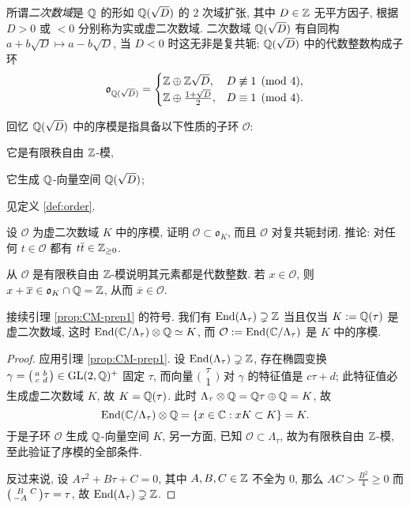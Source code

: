 所谓\emph{二次数域}是 $\mathbb{Q}$ 的形如 $\mathbb{Q}(\sqrt{D})$ 的 $2$ 次域扩张, 其中 $D \in \mathbb{Z}$ 无平方因子, 根据 $D > 0$ 或 $< 0$ 分别称为实或虚二次数域. 二次数域 $\mathbb{Q}(\sqrt{D})$ 有自同构 $a + b\sqrt{D} \mapsto a - b\sqrt{D}$, 当 $D < 0$ 时这无非是复共轭; $\mathbb{Q}(\sqrt{D})$ 中的代数整数构成子环
\[ \mathfrak{o}_{\mathbb{Q}(\sqrt{D})} = \begin{cases}
	\mathbb{Z} \oplus \mathbb{Z}\sqrt{D}, & D \not\equiv 1 \pmod{4}, \\
	\mathbb{Z} \oplus \frac{1 + \sqrt{D}}{2}, & D \equiv 1 \pmod{4}.
\end{cases}\]

回忆 $\mathbb{Q}(\sqrt{D})$ 中的序模是指具备以下性质的子环 $\mathcal{O}$:
\begin{inparaenum}[(a)]
	\item 它是有限秩自由 $\mathbb{Z}$-模,
	\item 它生成 $\mathbb{Q}$-向量空间 $\mathbb{Q}(\sqrt{D})$;
\end{inparaenum}
见定义 \ref{def:order}.

\begin{exercise}\label{exo:order-integral}
	设 $\mathcal{O}$ 为虚二次数域 $K$ 中的序模, 证明 $\mathcal{O} \subset \mathfrak{o}_K$, 而且 $\mathcal{O}$ 对复共轭封闭. 推论: 对任何 $t \in \mathcal{O}$ 都有 $t\overline{t} \in \mathbb{Z}_{\geq 0}$.
	
	\begin{hint}
		从 $\mathcal{O}$ 是有限秩自由 $\mathbb{Z}$-模说明其元素都是代数整数. 若 $x \in \mathcal{O}$, 则 $x + \overline{x} \in \mathfrak{o}_K \cap \mathbb{Q} = \mathbb{Z}$, 从而 $\overline{x} \in \mathcal{O}$.
	\end{hint}
\end{exercise}

\begin{lemma}\label{prop:CM-prep2} 
	接续引理 \ref{prop:CM-prep1} 的符号. 我们有 $\operatorname{End}(\Lambda_\tau) \supsetneq \mathbb{Z}$ 当且仅当 $K := \mathbb{Q}(\tau)$ 是虚二次数域, 这时 $\operatorname{End}(\mathbb{C}/\Lambda_\tau) \otimes \mathbb{Q} \simeq K$, 而 $\mathcal{O} := \operatorname{End}(\mathbb{C}/\Lambda_\tau)$ 是 $K$ 中的序模.
\end{lemma}
\begin{proof}
	应用引理 \ref{prop:CM-prep1}. 设 $\operatorname{End}(\Lambda_\tau) \supsetneq \mathbb{Z}$, 存在椭圆变换 $\gamma = \bigl(\begin{smallmatrix} a & b \\ c & d \end{smallmatrix}\bigr) \in \operatorname{GL}(2, \mathbb{Q})^+$ 固定 $\tau$, 而向量 $\bigl( \begin{smallmatrix} \tau \\ 1 \end{smallmatrix} \bigr)$ 对 $\gamma$ 的特征值是 $c\tau + d$; 此特征值必生成虚二次数域 $K$, 故 $K = \mathbb{Q}(\tau)$. 此时 $\Lambda_\tau \otimes \mathbb{Q} = \mathbb{Q}\tau \oplus \mathbb{Q} = K$, 故
	\[ \operatorname{End}(\mathbb{C}/\Lambda_\tau) \otimes \mathbb{Q} = \left\{ x \in \mathbb{C}: x K \subset K \right\} = K. \]
	于是子环 $\mathcal{O}$ 生成 $\mathbb{Q}$-向量空间 $K$, 另一方面, 已知 $\mathcal{O} \subset \Lambda_\tau$, 故为有限秩自由 $\mathbb{Z}$-模, 至此验证了序模的全部条件.
	
	反过来说, 设 $A\tau^2 + B\tau + C = 0$, 其中 $A, B, C \in \mathbb{Z}$ 不全为 $0$, 那么 $AC > \frac{B^2}{4} \geq 0$ 而 $\bigl(\begin{smallmatrix} B & C \\ -A &  \end{smallmatrix}\bigr) \tau = \tau$, 故 $\operatorname{End}(\Lambda_\tau) \supsetneq \mathbb{Z}$. 
\end{proof}

